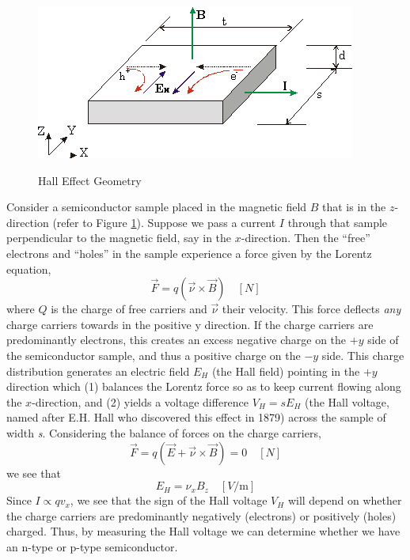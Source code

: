 \documentclass{../lab}
\begin{document}
\begin{figure}[h]
    \centering
    \href{http://experimentationlab.berkeley.edu/sites/default/files/images/SHEimage028.gif}{\includegraphics[width=0.5\linewidth]{images/SHEimage028.png}}
    \caption{Hall Effect Geometry}
    \label{fig:HallEffectGeometry}
\end{figure}

Consider a semiconductor sample placed in the magnetic field $B$ that is in the $z$-direction (refer to Figure \ref{fig:HallEffectGeometry}). Suppose we pass a current $I$ through that sample perpendicular to the magnetic field, say in the $x$-direction. Then the ``free'' electrons and ``holes'' in the sample experience a force given by the Lorentz equation,
\begin{equation}
    \vec{F}=q(\vec{\nu}\times\vec{B}) \quad [N]
\end{equation}
where $Q$ is the charge of free carriers and $ \vec{\nu} $ their velocity. This force deflects \emph{any} charge carriers towards in the positive y direction. If the charge carriers are predominantly electrons, this creates an excess negative charge on the $+y$ side of the semiconductor sample, and thus a positive charge on the $-y$ side. This charge distribution generates an electric field $ E_H $ (the Hall field) pointing in the $+y$ direction which (1) balances the Lorentz force so as to keep current flowing along the $x$-direction, and (2) yields a voltage difference $ V_H=sE_H $ (the Hall voltage, named after E.H. Hall who discovered this effect in 1879) across the sample of width \emph{s}. Considering the balance of forces on the charge carriers,
\begin{equation}
    \vec{F}=q(\vec{E}+\vec{\nu}\times\vec{B})=0 \quad [N]
\end{equation}
we see that
\begin{equation}
    E_H=\nu_xB_z \quad [V/\text{m}]
\end{equation}
Since $ I\propto qv_x $, we see that the sign of the Hall voltage $ V_H $ will depend on whether the charge carriers are predominantly negatively (electrons) or positively (holes) charged. Thus, by measuring the Hall voltage we can determine whether we have an n-type or p-type semiconductor.
\end{document}

